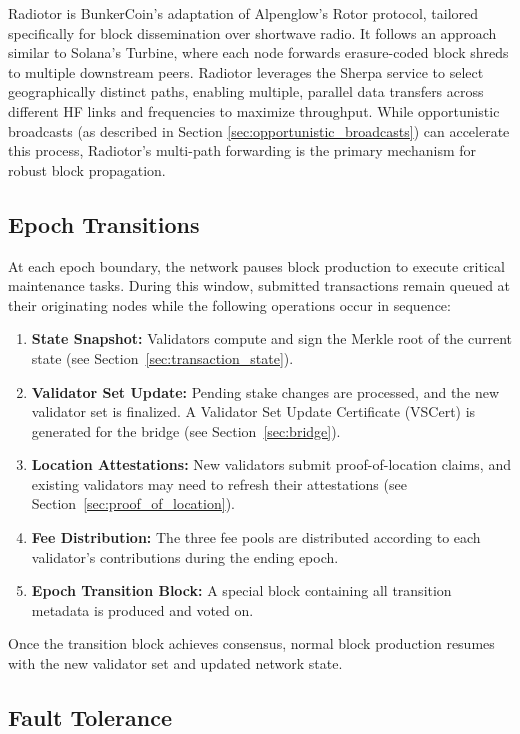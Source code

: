 \documentclass{article}
\begin{document}
Radiotor is BunkerCoin's adaptation of Alpenglow's Rotor protocol, tailored specifically for block dissemination over shortwave radio. It follows an approach similar to Solana's Turbine, where each node forwards erasure-coded block shreds to multiple downstream peers. Radiotor leverages the Sherpa service to select geographically distinct paths, enabling multiple, parallel data transfers across different HF links and frequencies to maximize throughput. While opportunistic broadcasts (as described in Section \ref{sec:opportunistic_broadcasts}) can accelerate this process, Radiotor's multi-path forwarding is the primary mechanism for robust block propagation.

\subsection{Epoch Transitions}
\label{sec:epoch_transitions}

At each epoch boundary, the network pauses block production to execute critical maintenance tasks. During this window, submitted transactions remain queued at their originating nodes while the following operations occur in sequence:

\begin{enumerate}
    \item \textbf{State Snapshot:} Validators compute and sign the Merkle root of the current state (see Section~\ref{sec:transaction_state}).
    \item \textbf{Validator Set Update:} Pending stake changes are processed, and the new validator set is finalized. A Validator Set Update Certificate (VSCert) is generated for the bridge (see Section~\ref{sec:bridge}).
    \item \textbf{Location Attestations:} New validators submit proof-of-location claims, and existing validators may need to refresh their attestations (see Section~\ref{sec:proof_of_location}).
    \item \textbf{Fee Distribution:} The three fee pools are distributed according to each validator's contributions during the ending epoch.
    \item \textbf{Epoch Transition Block:} A special block containing all transition metadata is produced and voted on.
\end{enumerate}

Once the transition block achieves consensus, normal block production resumes with the new validator set and updated network state.

\subsection{Fault Tolerance}
\end{document}
